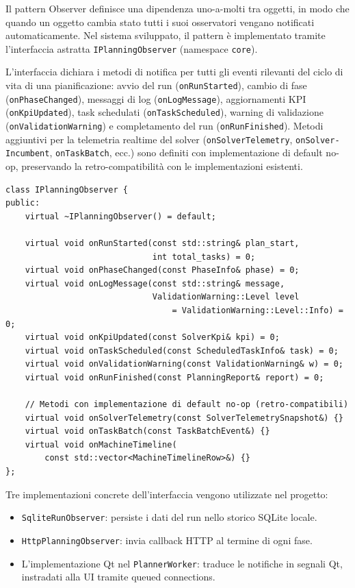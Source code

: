 Il pattern Observer definisce una dipendenza uno-a-molti tra oggetti, in modo che quando un oggetto cambia stato tutti i suoi osservatori vengano notificati automaticamente. Nel sistema sviluppato, il pattern è implementato tramite l'interfaccia astratta \texttt{IPlanningObserver} (namespace \texttt{core}).

L'interfaccia dichiara i metodi di notifica per tutti gli eventi rilevanti del ciclo di vita di una pianificazione: avvio del run (\texttt{onRunStarted}), cambio di fase (\texttt{onPhaseChanged}), messaggi di log (\texttt{onLogMessage}), aggiornamenti KPI (\texttt{onKpiUpdated}), task schedulati (\texttt{onTaskScheduled}), warning di validazione (\texttt{onValidationWarning}) e completamento del run (\texttt{onRunFinished}). Metodi aggiuntivi per la telemetria realtime del solver (\texttt{onSolverTelemetry}, \texttt{onSolver- Incumbent}, \texttt{onTaskBatch}, ecc.) sono definiti con implementazione di default no-op, preservando la retro-compatibilità con le implementazioni esistenti.

\begin{listing}[H]
\begin{verbatim}
class IPlanningObserver {
public:
    virtual ~IPlanningObserver() = default;

    virtual void onRunStarted(const std::string& plan_start,
                              int total_tasks) = 0;
    virtual void onPhaseChanged(const PhaseInfo& phase) = 0;
    virtual void onLogMessage(const std::string& message,
                              ValidationWarning::Level level
                                  = ValidationWarning::Level::Info) = 0;
    virtual void onKpiUpdated(const SolverKpi& kpi) = 0;
    virtual void onTaskScheduled(const ScheduledTaskInfo& task) = 0;
    virtual void onValidationWarning(const ValidationWarning& w) = 0;
    virtual void onRunFinished(const PlanningReport& report) = 0;

    // Metodi con implementazione di default no-op (retro-compatibili)
    virtual void onSolverTelemetry(const SolverTelemetrySnapshot&) {}
    virtual void onTaskBatch(const TaskBatchEvent&) {}
    virtual void onMachineTimeline(
        const std::vector<MachineTimelineRow>&) {}
};
\end{verbatim}
\caption{Interfaccia \texttt{IPlanningObserver} (semplificata).}
\label{listing:observer}
\end{listing}

Tre implementazioni concrete dell'interfaccia vengono utilizzate nel progetto:
\begin{itemize}
    \item \texttt{SqliteRunObserver}: persiste i dati del run nello storico SQLite locale.
    \item \texttt{HttpPlanningObserver}: invia callback HTTP al termine di ogni fase.
    \item L'implementazione Qt nel \texttt{PlannerWorker}: traduce le notifiche in segnali Qt, instradati alla UI tramite queued connections.
\end{itemize}


